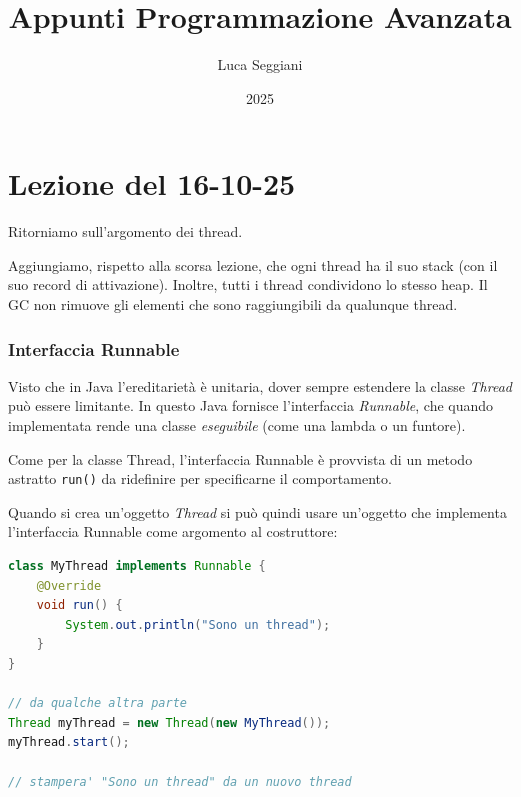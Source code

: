 \documentclass[a4paper,11pt]{article}
\title{Appunti Programmazione Avanzata}
\author{Luca Seggiani}
\date{2025}
\begin{document}
\section{Lezione del 16-10-25}

\thispagestyle{empty}
\pagestyle{fancy}

Ritorniamo sull'argomento dei thread.

Aggiungiamo, rispetto alla scorsa lezione, che ogni thread ha il suo stack (con il suo record di attivazione).
Inoltre, tutti i thread condividono lo stesso heap. Il GC non rimuove gli elementi che sono raggiungibili da qualunque thread.

\subsubsection{Interfaccia Runnable}
Visto che in Java l'ereditarietà è unitaria, dover sempre estendere la classe \textit{Thread} può essere limitante.
In questo Java fornisce l'interfaccia \textit{Runnable}, che quando implementata rende una classe \textit{eseguibile} (come una lambda o un funtore).

Come per la classe Thread, l'interfaccia Runnable è provvista di un metodo astratto \lstinline|run()| da ridefinire per specificarne il comportamento.

Quando si crea un'oggetto \textit{Thread} si può quindi usare un'oggetto che implementa l'interfaccia Runnable come argomento al costruttore:
\begin{lstlisting}[language=java, style=codestyle]	
class MyThread implements Runnable {
	@Override
	void run() {
		System.out.println("Sono un thread");
	}
}

// da qualche altra parte
Thread myThread = new Thread(new MyThread());
myThread.start();

// stampera' "Sono un thread" da un nuovo thread
\end{lstlisting}
\end{document}
